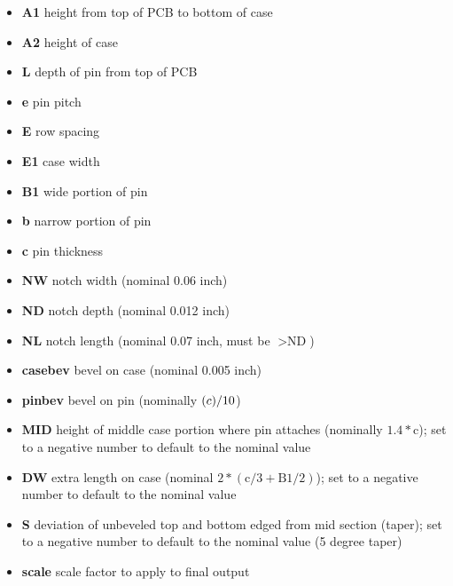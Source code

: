 \documentclass[a4paper, dvipdfm]{article}
\begin{document}
\begin{itemize}
\item\textbf{A1} height from top of PCB to bottom of case\\
\item\textbf{A2} height of case\\
\item\textbf{L} depth of pin from top of PCB\\
\item\textbf{e} pin pitch\\
\item\textbf{E} row spacing\\
\item\textbf{E1} case width\\
\item\textbf{B1} wide portion of pin\\
\item\textbf{b} narrow portion of pin\\
\item\textbf{c} pin thickness\\
\item\textbf{NW} notch width (nominal 0.06 inch)\\
\item\textbf{ND} notch depth (nominal 0.012 inch)\\
\item\textbf{NL} notch length (nominal 0.07 inch, must be $\gt\textrm{ND}$)\\
\item\textbf{casebev} bevel on case (nominal 0.005 inch)\\
\item\textbf{pinbev} bevel on pin (nominally $\textrm(c)/10$)\\
\item\textbf{MID} height of middle case portion where pin attaches (nominally $1.4*\textrm{c}$);
    set to a negative number to default to the nominal value\\
\item\textbf{DW} extra length on case (nominal $2*(\textrm{c}/3 + \textrm{B}1/2)$);
    set to a negative number to default to the nominal value\\
\item\textbf{S} deviation of unbeveled top and bottom edged from mid section (taper);
    set to a negative number to default to the nominal value (5 degree taper)\\
\item\textbf{scale} scale factor to apply to final output\\
\end{itemize}
\end{document}

